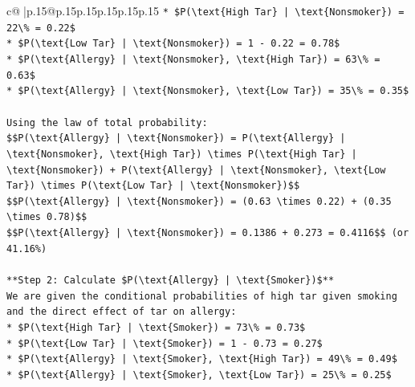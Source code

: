 \documentclass{article}
\begin{document}
{\begin{supertabular}{c@{$\;$}|p{.15\linewidth}@{}p{.15\linewidth}p{.15\linewidth}p{.15\linewidth}p{.15\linewidth}p{.15\linewidth}}
{{{\texttt{*   \$P(\textbackslash{}text\{High Tar\} | \textbackslash{}text\{Nonsmoker\}) = 22\textbackslash{}\% = 0.22\$} \\
\texttt{*   \$P(\textbackslash{}text\{Low Tar\} | \textbackslash{}text\{Nonsmoker\}) = 1 {-} 0.22 = 0.78\$} \\
\texttt{*   \$P(\textbackslash{}text\{Allergy\} | \textbackslash{}text\{Nonsmoker\}, \textbackslash{}text\{High Tar\}) = 63\textbackslash{}\% = 0.63\$} \\
\texttt{*   \$P(\textbackslash{}text\{Allergy\} | \textbackslash{}text\{Nonsmoker\}, \textbackslash{}text\{Low Tar\}) = 35\textbackslash{}\% = 0.35\$} \\
\\ 
\texttt{Using the law of total probability:} \\
\texttt{\$\$P(\textbackslash{}text\{Allergy\} | \textbackslash{}text\{Nonsmoker\}) = P(\textbackslash{}text\{Allergy\} | \textbackslash{}text\{Nonsmoker\}, \textbackslash{}text\{High Tar\}) \textbackslash{}times P(\textbackslash{}text\{High Tar\} | \textbackslash{}text\{Nonsmoker\}) + P(\textbackslash{}text\{Allergy\} | \textbackslash{}text\{Nonsmoker\}, \textbackslash{}text\{Low Tar\}) \textbackslash{}times P(\textbackslash{}text\{Low Tar\} | \textbackslash{}text\{Nonsmoker\})\$\$} \\
\texttt{\$\$P(\textbackslash{}text\{Allergy\} | \textbackslash{}text\{Nonsmoker\}) = (0.63 \textbackslash{}times 0.22) + (0.35 \textbackslash{}times 0.78)\$\$} \\
\texttt{\$\$P(\textbackslash{}text\{Allergy\} | \textbackslash{}text\{Nonsmoker\}) = 0.1386 + 0.273 = 0.4116\$\$ (or 41.16\%)} \\
\\ 
\texttt{**Step 2: Calculate \$P(\textbackslash{}text\{Allergy\} | \textbackslash{}text\{Smoker\})\$**} \\
\texttt{We are given the conditional probabilities of high tar given smoking and the direct effect of tar on allergy:} \\
\texttt{*   \$P(\textbackslash{}text\{High Tar\} | \textbackslash{}text\{Smoker\}) = 73\textbackslash{}\% = 0.73\$} \\
\texttt{*   \$P(\textbackslash{}text\{Low Tar\} | \textbackslash{}text\{Smoker\}) = 1 {-} 0.73 = 0.27\$} \\
\texttt{*   \$P(\textbackslash{}text\{Allergy\} | \textbackslash{}text\{Smoker\}, \textbackslash{}text\{High Tar\}) = 49\textbackslash{}\% = 0.49\$} \\
\texttt{*   \$P(\textbackslash{}text\{Allergy\} | \textbackslash{}text\{Smoker\}, \textbackslash{}text\{Low Tar\}) = 25\textbackslash{}\% = 0.25\$} \\
}}}
\end{supertabular}}
\end{document}
